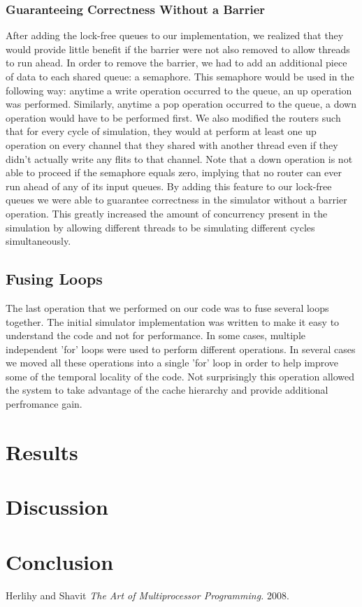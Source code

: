 \documentclass{article}
\begin{document}
\begin{multicols}{2}
\subsubsection{Guaranteeing Correctness Without a Barrier}
After adding the lock-free queues to our implementation, we realized that
they would provide little benefit if the barrier were not also removed to
allow threads to run ahead.  In order to remove the barrier, we had to add
an additional piece of data to each shared queue: a semaphore.  This
semaphore would be used in the following way: anytime a write operation
occurred to the queue, an up operation was performed.  Similarly, anytime
a pop operation occurred to the queue, a down operation would have to be
performed first.  We also modified the routers such that for every cycle
of simulation, they would at perform at least one up operation on every
channel that they shared with another thread even if they didn't actually
write any flits to that channel.  Note that a down operation is not able
to proceed if the semaphore equals zero, implying that no router can ever
run ahead of any of its input queues.  By adding this feature to our
lock-free queues we were able to guarantee correctness in the simulator
without a barrier operation.  This greatly increased the amount of
concurrency present in the simulation by allowing different threads to be
simulating different cycles simultaneously.

\subsection{Fusing Loops}
The last operation that we performed on our code was to fuse several loops
together.  The initial simulator implementation was written to make it
easy to understand the code and not for performance.  In some cases,
multiple independent 'for' loops were used to perform different
operations.  In several cases we moved all these operations into a single
'for' loop in order to help improve some of the temporal locality of the
code.  Not surprisingly this operation allowed the system to take
advantage of the cache hierarchy and provide additional perfromance gain.

\section{Results \label{results}}

\section{Discussion \label{disc}}

\section{Conclusion \label{conc}}


\begin{thebibliography}{99}
 Herlihy and Shavit {\em The Art of Multiprocessor Programming.} 2008.


\end{thebibliography}
\end{multicols}
\end{document}
